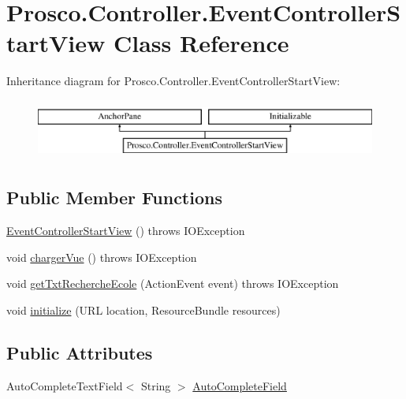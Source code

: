 \hypertarget{class_prosco_1_1_controller_1_1_event_controller_start_view}{\section{Prosco.\-Controller.\-Event\-Controller\-Start\-View Class Reference}
\label{class_prosco_1_1_controller_1_1_event_controller_start_view}
}
Inheritance diagram for Prosco.\-Controller.\-Event\-Controller\-Start\-View\-:\begin{figure}[H]
\begin{center}
\leavevmode
\includegraphics[height=2.000000cm]{class_prosco_1_1_controller_1_1_event_controller_start_view}
\end{center}
\end{figure}
\subsection*{Public Member Functions}
\begin{DoxyCompactItemize}
\item 
\hyperlink{class_prosco_1_1_controller_1_1_event_controller_start_view_a8d3cee31f90605c5516409651f18d3d3}{Event\-Controller\-Start\-View} ()  throws I\-O\-Exception 
\item 
void \hyperlink{class_prosco_1_1_controller_1_1_event_controller_start_view_ae0902afc9a2de5053fa348741ee942ae}{charger\-Vue} ()  throws I\-O\-Exception 
\item 
void \hyperlink{class_prosco_1_1_controller_1_1_event_controller_start_view_aa8abb906535c54da6792eddd453d4296}{get\-Txt\-Recherche\-Ecole} (Action\-Event event)  throws I\-O\-Exception 
\item 
void \hyperlink{class_prosco_1_1_controller_1_1_event_controller_start_view_ac8d58197fce39c723c362f6cbea19d40}{initialize} (U\-R\-L location, Resource\-Bundle resources)
\end{DoxyCompactItemize}
\subsection*{Public Attributes}
\begin{DoxyCompactItemize}
\item 
Auto\-Complete\-Text\-Field$<$ String $>$ \hyperlink{class_prosco_1_1_controller_1_1_event_controller_start_view_a09dbfa302461698bb8489c574860f99f}{Auto\-Complete\-Field}
\end{DoxyCompactItemize}


